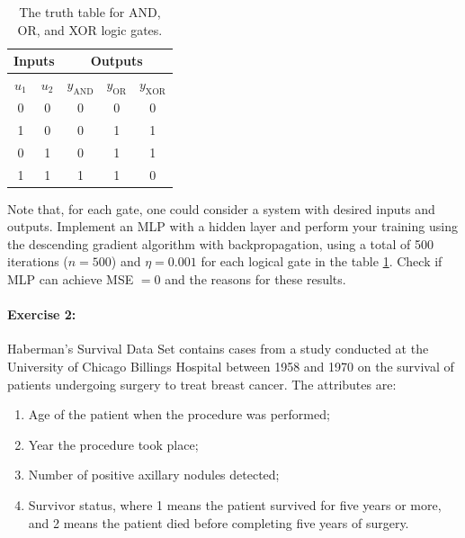 \documentclass[ruled,graybox]{svmult}
\begin{document}
\begin{table}[h!]
\caption{The truth table for AND, OR, and XOR logic gates.}
\label{tab:verdade}
\begin{center}
\begin{tabular}{cc|ccc}
\hline
\multicolumn{2}{c|}{Inputs} & \multicolumn{3}{c}{Outputs}                                  \\ \hline
$u_1$         & $u_2$        & $y_{\textrm{AND}}$ & $y_{\textrm{OR}}$ & $y_{\textrm{XOR}}$ \\ \hline
0             & 0            & 0                  & 0                 & 0                  \\
1             & 0            & 0                  & 1                 & 1                  \\
0             & 1            & 0                  & 1                 & 1                  \\
1             & 1            & 1                  & 1                 & 0                 \\ \hline
\end{tabular}
\end{center}
\end{table}

Note that, for each gate, one could consider a system with desired inputs and outputs. Implement an MLP with a hidden layer and perform your training using the descending gradient algorithm with backpropagation, using a total of 500 iterations ($n = 500$) and $\eta = 0.001$ for each logical gate in the table \ref{tab:verdade}. Check if MLP can achieve MSE $ = 0$ and the reasons for these results.

\paragraph{\textbf{Exercise 2:}} Haberman's Survival Data Set contains cases from a study conducted at the University of Chicago Billings Hospital between 1958 and 1970 on the survival of patients undergoing surgery to treat breast cancer. The attributes are:
\begin{enumerate}
    \item Age of the patient when the procedure was performed;
	\item Year the procedure took place;
	\item Number of positive axillary nodules detected;
	\item Survivor status, where 1 means the patient survived for five years or more, and 2 means the patient died before completing five years of surgery.
\end{enumerate}
\end{document}
